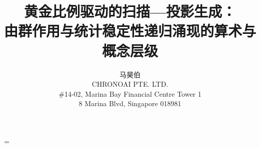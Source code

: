 \documentclass[11pt,letterpaper,fontset=fandol]{ctexart}
\title{黄金比例驱动的扫描—投影生成：\\\large 由群作用与统计稳定性递归涌现的算术与概念层级}
\author{马昊伯\\CHRONOAI PTE. LTD.\\\#14-02, Marina Bay Financial Centre Tower 1\\8 Marina Blvd, Singapore 018981}
\theoremstyle{plain}
\theoremstyle{definition}
\theoremstyle{remark}
\begin{document}
\sloppy
\hfuzz=\maxdimen\relax
\maketitle


\begingroup
{}\relax
\makeatletter
{}\@empty
\makeatother
\tableofcontents
\endgroup
\newpage



\FloatBarrier


\FloatBarrier


\end{document}

